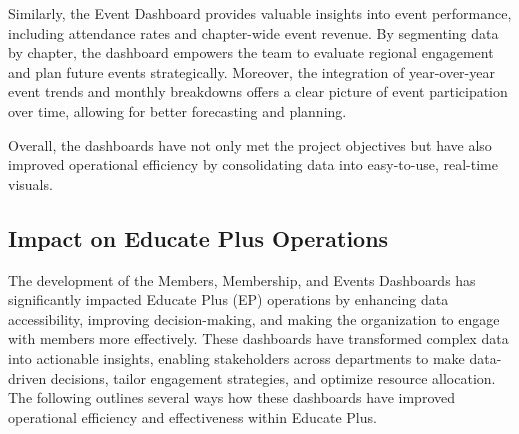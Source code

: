 \documentclass[11pt,a4paper,]{article}
\begin{document}
Similarly, the Event Dashboard provides valuable insights into event performance, including attendance rates and chapter-wide event revenue. By segmenting data by chapter, the dashboard empowers the team to evaluate regional engagement and plan future events strategically. Moreover, the integration of year-over-year event trends and monthly breakdowns offers a clear picture of event participation over time, allowing for better forecasting and planning.

Overall, the dashboards have not only met the project objectives but have also improved operational efficiency by consolidating data into easy-to-use, real-time visuals.

\subsection{Impact on Educate Plus Operations}\label{impact-on-educate-plus-operations}

The development of the Members, Membership, and Events Dashboards has significantly impacted Educate Plus (EP) operations by enhancing data accessibility, improving decision-making, and making the organization to engage with members more effectively. These dashboards have transformed complex data into actionable insights, enabling stakeholders across departments to make data-driven decisions, tailor engagement strategies, and optimize resource allocation. The following outlines several ways how these dashboards have improved operational efficiency and effectiveness within Educate Plus.
\end{document}

